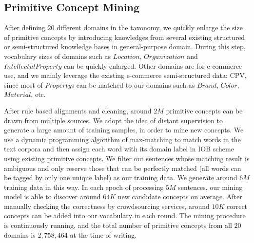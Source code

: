 \subsection{Primitive Concept Mining}
\label{sec:eval_mining}
After defining $20$ different domains in the taxonomy,
we quickly enlarge the size of primitive concepts by introducing knowledges from several existing structured or semi-structured knowledge bases in general-purpose domain.
During this step, vocabulary sizes of domains such as $Location$, $Organization$ and $IntellectulProperty$ can be quickly enlarged.
Other domains are for e-commerce use, and we mainly leverage the existing e-commerce semi-structured data: CPV, since most of $Property$s can be matched to our domains such as $Brand$, $Color$, $Material$, etc.

After rule based alignments and cleaning, 
around $2M$ primitive concepts can be drawn from multiple sources.
We adopt the idea of distant supervision to
generate a large amount of training samples,
in order to mine new concepts.
We use a dynamic programming algorithm of max-matching to match words in the text corpora and then assign each word with its domain label in IOB scheme using existing primitive concepts. We filter out sentences whose matching result is ambiguous and only reserve those that can be perfectly matched (all words can be tagged by only one unique label) as our training data.
We generate around $6M$ training data in this way.
In each epoch of processing $5M$ sentences, 
our mining model is able to discover around $64K$ new candidate concepts on average.
After manually checking the correctness by crowdsourcing services, 
around $10K$ correct concepts can be added into our vocabulary in each round.
The mining procedure is continuously running, 
and the total number of primitive concepts from all $20$ domains 
is $2,758,464$ at the time of writing.







